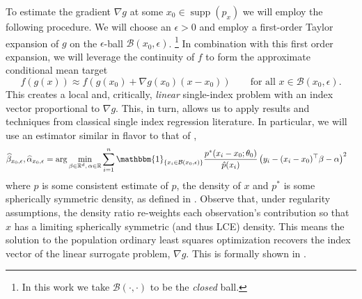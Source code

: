 \documentclass[11pt]{article}
\begin{document}
To estimate the gradient $\nabla g$ at some $x_0 \in \operatorname{supp}(p_x)$ we will employ the following procedure.  We will choose an $\epsilon > 0$ and employ a first-order Taylor expansion of $g$ on the $\epsilon$-ball $\mathcal{B}(x_0,\epsilon)$. \footnote{In this work we take $\mathcal{B}(\cdot, \cdot )$ to be the \textit{closed} ball.} In combination with this first order expansion, we will leverage the continuity of $f$ to form the approximate conditional mean target
\begin{equation} \label{eq: surrogate decomposition colloquial}
    f(g(x)) \approx f(g(x_0) + \nabla g(x_0)(x - x_0)) \qquad \text{for all }x \in \mathcal{B}(x_0, \epsilon).
\end{equation}
This creates a local and, critically, \textit{linear}  single-index problem with an index vector proportional to $\nabla g$. This, in turn, allows us to apply results and techniques from classical single index regression literature. In particular, we will use an estimator similar in flavor to that of \citet{Newey_Ruud_2005},
\begin{align} 
\widehat{\beta}_{x_0,\epsilon}, \widehat{\alpha}_{x_0, \epsilon} &= \arg\min_{\beta \in \mathbb{R}^d,\, \alpha \in \mathbb{R}} \sum_{i = 1}^{n}\mathbbm{1}_{\{x_i \in \mathcal{B}(x_0, \epsilon)\}}\frac{p^*(x_i - x_0;\theta_0)}{\hat{p}(x_i)}\left(y_i - (x_i - x_0)^{\top}\beta - \alpha\right)^2 
\end{align}
where $\hat{p}$ is some consistent estimate of $p$, the density of $x$ and $p^*$ is some spherically symmetric density, as defined in . Observe that, under regularity assumptions, the density ratio re-weights each observation's contribution so that $x$ has a limiting spherically symmetric (and thus LCE) density. This means the solution to the population ordinary least squares optimization recovers the index vector of the linear surrogate problem, $\nabla g$. This is formally shown in .  
\end{document}
